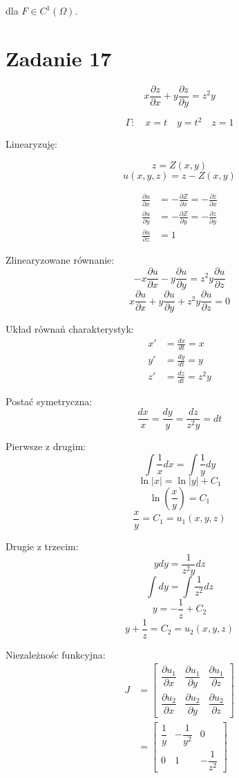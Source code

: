 \documentclass{article}
\begin{document}
dla $ F \in C^1(\Omega) $.



% 

\section*{Zadanie 17}
$$ 
x\frac{\partial{z}}{\partial{x}} +
y\frac{\partial{z}}{\partial{y}} =
z^2y
$$

$$ 
\Gamma: \quad x=t \quad y=t^2 \quad z=1 
$$

Linearyzuję:

$$ z = Z(x,y) $$
$$ u(x,y,z) = z - Z(x,y) $$

\begin{align*}
\frac{\partial{u}}{\partial{x}} &= -\frac{\partial{Z}}{\partial{x}} =
-\frac{\partial{z}}{\partial{x}} 
\\
\frac{\partial{u}}{\partial{y}} &= -\frac{\partial{Z}}{\partial{y}} =
-\frac{\partial{z}}{\partial{y}} 
\\
\frac{\partial{u}}{\partial{z}} &= 1
\end{align*}

Zlinearyzowane równanie:
$$ 
-x\frac{\partial{u}}{\partial{x}} 
-y\frac{\partial{u}}{\partial{y}} =
z^2y\frac{\partial{u}}{\partial{z}}
$$
$$ 
x\frac{\partial{u}}{\partial{x}} +
y\frac{\partial{u}}{\partial{y}} +
z^2y\frac{\partial{u}}{\partial{z}} = 0
$$


Układ równań charakterystyk:
\begin{align*}
    x' &= \frac{dx}{dt} = x  \\
    y' &= \frac{dy}{dt} = y  \\
    z' &= \frac{dz}{dt} = z^2y
\end{align*}


Postać symetryczna:
$$
\frac{dx}{x} = \frac{dy}{y} = \frac{dz}{z^2y} = dt
$$


Pierwsze z drugim:
$$
\int \frac{1}{x} dx = \int \frac{1}{y} dy 
$$
$$
\ln|x| = \ln|y| + C_1
$$
$$
\ln\left(\frac{x}{y}\right) = C_1 
$$
$$
\frac{x}{y} = C_1 = u_1(x,y,z)
$$

Drugie z trzecim:
$$
y dy = \frac{1}{z^2y} dz
$$
$$
\int dy = \int \frac{1}{z^2} dz
$$
$$
y = -\frac{1}{z} + C_2
$$
$$
y + \frac{1}{z} = C_2 = u_2(x,y,z)
$$


Niezależnośc funkcyjna: \\ 
\begin{align*}
J &= \begin{bmatrix}
    \dfrac{\partial{u_1}}{\partial{x}} & \dfrac{\partial{u_1}}{\partial{y}} & \dfrac{\partial{u_1}}{\partial{z}} \\
    \dfrac{\partial{u_2}}{\partial{x}} & \dfrac{\partial{u_2}}{\partial{y}} & \dfrac{\partial{u_2}}{\partial{z}}
\end{bmatrix} \\
&= \begin{bmatrix}
    \dfrac{1}{y} & -\dfrac{1}{y^2} & 0 \\
    0 & 1 & -\dfrac{1}{z^2}
\end{bmatrix}
\end{align*}
\end{document}
